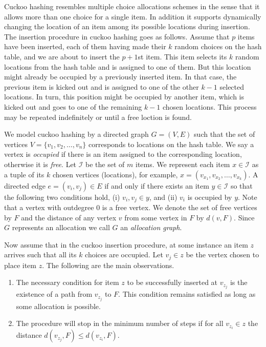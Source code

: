 Cuckoo hashing resembles multiple choice allocations schemes in the sense that it allows more than one choice for a single item. In addition it supports dynamically changing the location of an item among its possible locations during insertion. The insertion procedure in cuckoo hashing goes as follows. Assume that $p$ items have been inserted, each of them having made their $k$ random choices on the hash table, and we are about to insert the $p+1$st item. This item selects its $k$ random locations from the hash table and is assigned to one of them. But this location might already be occupied by a previously inserted item. In that case, the previous item is kicked out and is assigned to one of the other $k-1$ selected locations. In turn, this position might be occupied by another item, which is kicked out and goes to one of the remaining $k-1$ chosen locations. This process may be repeated indefinitely or until a free loction is found. 

We model cuckoo hashing by a directed graph $G=(V,E)$  such that the set of vertices $V=\{v_1,v_2,\ldots,v_n\}$ corresponds to locations on the hash table. We say a vertex is \emph{occupied} if there is an item assigned to the corresponding location, otherwise it is \emph{free}. Let $\mathcal{I}$ be the set of $m$ items. We represent each item $x\in\mathcal{I} $ as a tuple of its $k$ chosen vertices (locations), for example, $x=(v_{x_1},v_{x_2},\ldots , v_{x_k})$.
A directed edge $e=(v_i,v_j) \in E$ if and only if there exists an item $y\in \mathcal{I} $ so that the following two conditions hold, (i) $v_i,v_j \in y$, and (ii) $v_i$ is occupied by $y$. Note that a vertex with outdegree $0$ is a free vertex. We denote the set of free vertices by $F$ and the distance of any vertex $v$ from some vertex in $F$ by $d(v,F)$. Since $G$ represents an allocation we call $G$ an \emph{allocation graph}. 


Now assume that in the cuckoo insertion procedure, at some instance an item $z$ arrives such that all its $k$ choices are occupied. Let $v_j\in z$ be the vertex chosen to place item $z$. The following are the main observations.

 \begin{enumerate}
\item The necessary condition for item $z$ to be successfully inserted at $v_{z_j}$ is the existence of a path from $v_{z_j}$ to $F$. This condition remains satisfied as long as some allocation is possible.
\item The procedure will stop in the minimum number of steps if for all $v_{z_i}\in z$  the distance $d(v_{z_j},F)\le d(v_{z_i},F)$. \end{enumerate}

